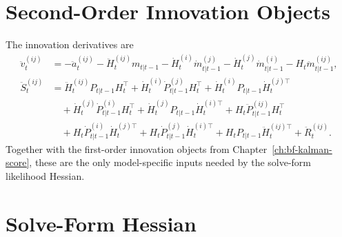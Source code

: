 \section{Second-Order Innovation Objects}
\label{sec:bf-hessian-innovation}

The innovation derivatives are
\begin{align}
\label{eq:bf-hessian-innovation}
  \ddot v_t^{(ij)}
  &=
  -\ddot a_t^{(ij)}
  -\ddot H_t^{(ij)}m_{t|t-1}
  -\dot H_t^{(i)}\dot m_{t|t-1}^{(j)}
  -\dot H_t^{(j)}\dot m_{t|t-1}^{(i)}
  -H_t\ddot m_{t|t-1}^{(ij)},\\
\label{eq:bf-hessian-innovation-cov}
  \ddot S_t^{(ij)}
  &=
  \ddot H_t^{(ij)}P_{t|t-1}H_t^\top
  +\dot H_t^{(i)}\dot P_{t|t-1}^{(j)}H_t^\top
  +\dot H_t^{(i)}P_{t|t-1}\dot H_t^{(j)\top} \nonumber\\
  &\quad
  +\dot H_t^{(j)}\dot P_{t|t-1}^{(i)}H_t^\top
  +\dot H_t^{(j)}P_{t|t-1}\dot H_t^{(i)\top}
  +H_t\ddot P_{t|t-1}^{(ij)}H_t^\top \nonumber\\
  &\quad
  +H_t\dot P_{t|t-1}^{(i)}\dot H_t^{(j)\top}
  +H_t\dot P_{t|t-1}^{(j)}\dot H_t^{(i)\top}
  +H_tP_{t|t-1}\ddot H_t^{(ij)\top}
  +\ddot R_t^{(ij)}.
\end{align}
Together with the first-order innovation objects from
Chapter~\ref{ch:bf-kalman-score}, these are the only model-specific inputs
needed by the solve-form likelihood Hessian.

\section{Solve-Form Hessian}
\label{sec:bf-solve-form-hessian}

